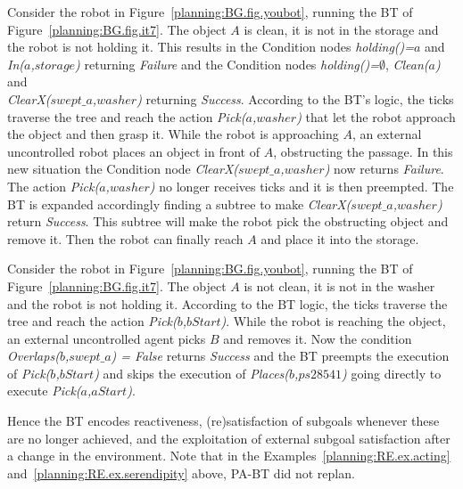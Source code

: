 \begin{example}
\label{planning:RE.ex.planning}
Consider the robot in Figure~\ref{planning:BG.fig.youbot}, running the BT of Figure~\ref{planning:BG.fig.it7}. The object $A$ is clean, it is not in the storage and the robot is not holding it. This results in the Condition nodes \emph{holding()=$a$}  and \emph{In($a$,$storage$)} returning  \emph{Failure} and the Condition nodes \emph{holding()=$\emptyset$}, \emph{Clean($a$)} and \\ \emph{ClearX($swept\_a$,$washer$)} returning  \emph{Success}.  According to the BT's logic,  the ticks traverse the tree and reach the action \emph{Pick($a$,$washer$)} that let the robot approach the object and then grasp it. While the robot is approaching $A$, an external uncontrolled robot places an object in front of $A$, obstructing the passage. In this new situation the Condition node \emph{ClearX($swept\_a$,$washer$)} now returns  \emph{Failure}. The action \emph{Pick($a$,$washer$)}  no longer receives ticks and it is then preempted. The BT is expanded accordingly finding a subtree to make \emph{ClearX($swept\_a$,$washer$)} return  \emph{Success}. This subtree will make the robot pick the obstructing object and remove it. Then the robot can finally reach $A$ and place it into the storage.
\end{example}

\begin{example}
\label{planning:RE.ex.serendipity}
Consider the robot in Figure~\ref{planning:BG.fig.youbot}, running the BT of Figure~\ref{planning:BG.fig.it7}. The object $A$ is not clean, it is not in the washer and the robot is not holding it. According to the BT logic, the ticks traverse the tree and reach the action \emph{Pick($b$,$bStart$)}. While the robot is reaching the object, an external uncontrolled agent picks $B$ and removes it. Now the condition \emph{Overlaps($b$,$swept\_a$) = False} returns  \emph{Success} and the BT preempts the execution of \emph{Pick($b$,$bStart$)} and skips the execution of \emph{Places($b$,$ps28541$)} going directly to execute \emph{Pick($a$,$aStart$)}.
\end{example}

Hence the BT encodes reactiveness, (re)satisfaction of subgoals whenever these are no longer achieved, and the exploitation of  external subgoal satisfaction after a change in the environment. Note that in the Examples~\ref{planning:RE.ex.acting} and~\ref{planning:RE.ex.serendipity} above, PA-BT did not replan.

